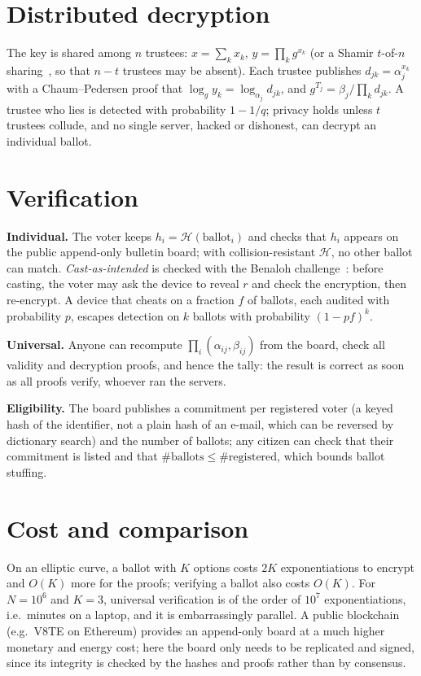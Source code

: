 \documentclass[10pt,twocolumn]{article}
\begin{document}
\section{Distributed decryption}
The key is shared among $n$ trustees: $x=\sum_kx_k$, $y=\prod_kg^{x_k}$ (or a Shamir $t$-of-$n$ sharing~\cite{shamir1979,pedersen1991}, so that $n-t$ trustees may be absent). Each trustee publishes $d_{jk}=\alpha_j^{x_k}$ with a Chaum--Pedersen proof that $\log_g y_k=\log_{\alpha_j}d_{jk}$, and $g^{T_j}=\beta_j/\prod_kd_{jk}$. A trustee who lies is detected with probability $1-1/q$; privacy holds unless $t$ trustees collude, and no single server, hacked or dishonest, can decrypt an individual ballot.

\section{Verification}
\textbf{Individual.} The voter keeps $h_i=\mathcal H(\text{ballot}_i)$ and checks that $h_i$ appears on the public append-only bulletin board; with collision-resistant $\mathcal H$, no other ballot can match. \emph{Cast-as-intended} is checked with the Benaloh challenge~\cite{benaloh2006}: before casting, the voter may ask the device to reveal $r$ and check the encryption, then re-encrypt. A device that cheats on a fraction $f$ of ballots, each audited with probability $p$, escapes detection on $k$ ballots with probability $(1-pf)^k$.

\textbf{Universal.} Anyone can recompute $\prod_i(\alpha_{ij},\beta_{ij})$ from the board, check all validity and decryption proofs, and hence the tally: the result is correct as soon as all proofs verify, whoever ran the servers.

\textbf{Eligibility.} The board publishes a commitment per registered voter (a keyed hash of the identifier, not a plain hash of an e-mail, which can be reversed by dictionary search) and the number of ballots; any citizen can check that their commitment is listed and that $\#\text{ballots}\le\#\text{registered}$, which bounds ballot stuffing.

\section{Cost and comparison}
On an elliptic curve, a ballot with $K$ options costs $2K$ exponentiations to encrypt and $O(K)$ more for the proofs; verifying a ballot also costs $O(K)$. For $N=10^6$ and $K=3$, universal verification is of the order of $10^7$ exponentiations, i.e.\ minutes on a laptop, and it is embarrassingly parallel. A public blockchain (e.g.\ V8TE on Ethereum) provides an append-only board at a much higher monetary and energy cost; here the board only needs to be replicated and signed, since its integrity is checked by the hashes and proofs rather than by consensus.
\end{document}
